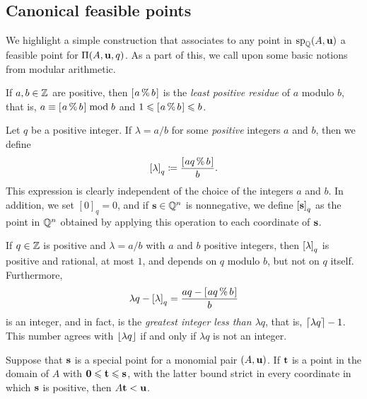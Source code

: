 \documentclass{amsart}
\begin{document}
\subsection{Canonical feasible points}

We highlight a simple construction that associates to any point in $\operatorname{sp}_{\mathbb{Q}}(A, \mathbf{u})$ a feasible point for $\Pi(A, \mathbf{u}, q)$.
As a part of this, we call upon some basic notions from modular arithmetic.

\begin{definition}
   If $a, b \in \mathbb{Z}$ are positive, then $[ \hspace{.01in} a \, \% \, b \hspace{.01in} ]$ is the \emph{least positive residue} of $a$ modulo $b$, that is, $a \equiv [ \hspace{.01in} a \, \% \, b \hspace{.01in} ] \bmod b$ and $1 \leqslant [ \hspace{.01in} a \, \% \, b \hspace{.01in} ] \leqslant b$.
\end{definition}

\begin{definition}
   \label{tail: D}
   Let $q$ be a positive integer.
   If $\lambda = a/b$ for some \emph{positive} integers $a$ and $b$, then we define
   \[ \left[ \lambda \right]_q \coloneqq \frac{ [ \hspace{.01in} aq \, \% \, b \hspace{.01in} ]}{b}. \]
   This expression is clearly independent of the choice of the integers $a$ and $b$.
   In addition, we set  $[0]_q = 0$, and if $\mathbf{s} \in \mathbb{Q}^n$ is nonnegative, we define $\left[ \mathbf{s} \right]_q$ as the point in $\mathbb{Q}^n$ obtained by applying this operation to each coordinate of $\mathbf{s}$.
\end{definition}

\begin{remark}
   \label{tail-basics: R}
   If $q \in \mathbb{Z}$ is positive and $\lambda = a/b$ with $a$ and $b$ positive integers, then $\left[ \lambda \right]_q$ is positive and rational, at most $1$,  and depends on  $q$ modulo $b$, but not on $q$ itself.
   Furthermore,
   \[ \lambda q - \left[ \lambda \right]_q = \frac{aq-[ \hspace{.01in} aq \, \% \, b \hspace{.01in} ]}{b} \]
   is an integer, and in fact, is the \emph{greatest integer less than $\lambda q$}, that is, $\left\lceil \lambda q \right\rceil - 1$.
   This number agrees with $\left\lfloor  \lambda q \right\rfloor$ if and only if $\lambda q$ is not an integer.
\end{remark}

\begin{lemma}
   \label{less than u: L}
   Suppose that $\mathbf{s}$ is a special point for a monomial pair $(A, \mathbf{u})$.
   If $\mathbf{t}$ is a point in the domain of $A$ with $\mathbf{0} \leqslant \mathbf{t} \leqslant \mathbf{s}$, with the latter bound strict in every coordinate in which $\mathbf{s}$ is positive, then $A \mathbf{t} < \mathbf{u}$.
\end{lemma}
\end{document}
